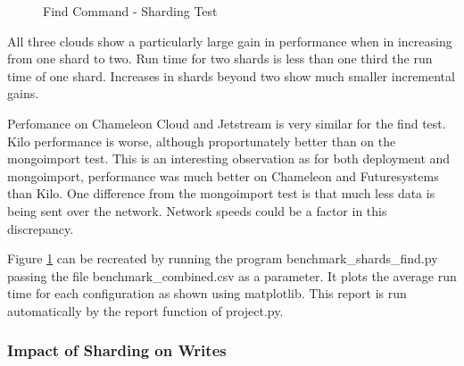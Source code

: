 \documentclass[9pt,twocolumn,twoside]{../../styles/osajnl}
\begin{document}
\begin{figure}[htbp]
\centering
{}
\caption{Find Command - Sharding Test}
\label{fig:shard-find}
\end{figure}


All three clouds show a particularly large gain in performance when in increasing from one shard to two.  Run time for two shards is less than one third the run time of one shard.  Increases in shards beyond two show much smaller incremental gains.

Perfomance on Chameleon Cloud and Jetstream is very similar for the find test.  Kilo performance is worse, although proportunately better than on the mongoimport test.  This is an interesting observation as for both deployment and mongoimport, performance was much better on Chameleon and Futuresystems than Kilo.  One difference from the mongoimport test is that much less data is being sent over the network.  Network speeds could be a factor in this discrepancy.

Figure \ref{fig:shard-find} can be recreated by running the program benchmark\_shards\_find.py passing the file benchmark\_combined.csv as a parameter.  It plots the average run time for each configuration as shown using matplotlib.  This report is run automatically by the report function of project.py.




\subsubsection{Impact of Sharding on Writes}
\end{document}
